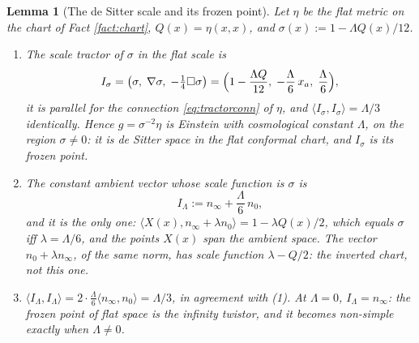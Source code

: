 \documentclass[11pt]{article}
\newtheorem{lemma}[theorem]{Lemma}
\theoremstyle{definition}
\newcommand{\ip}[2]{\langle #1, #2\rangle}
\begin{document}
\begin{lemma}[The de Sitter scale and its frozen point]\label{lem:dsscale}
Let $\eta$ be the flat metric on the chart of Fact \ref{fact:chart}, $Q(x) = \eta(x,x)$, and $\sigma(x) := 1 - \Lambda Q(x)/12$.
\begin{enumerate}
\item The scale tractor of $\sigma$ in the flat scale is
\[
I_{\sigma} = \bigl(\sigma,\; \nabla\sigma,\; -\tfrac14\Box\sigma\bigr) = \Bigl(1 - \frac{\Lambda Q}{12},\; -\frac{\Lambda}{6}\,x_{a},\; \frac{\Lambda}{6}\Bigr),
\]
it is parallel for the connection \eqref{eq:tractorconn} of $\eta$, and $\ip{I_{\sigma}}{I_{\sigma}} = \Lambda/3$ identically. Hence $g = \sigma^{-2}\eta$ is Einstein with cosmological constant $\Lambda$, on the region $\sigma \neq 0$: it is de Sitter space in the flat conformal chart, and $I_{\sigma}$ is its frozen point.
\item The constant ambient vector whose scale function is $\sigma$ is
\[
I_{\Lambda} := n_{\infty} + \frac{\Lambda}{6}\, n_{0},
\]
and it is the only one: $\ip{X(x)}{n_{\infty} + \lambda n_{0}} = 1 - \lambda Q(x)/2$, which equals $\sigma$ iff $\lambda = \Lambda/6$, and the points $X(x)$ span the ambient space. The vector $n_{0} + \lambda n_{\infty}$, of the same norm, has scale function $\lambda - Q/2$: the inverted chart, not this one.
\item $\ip{I_{\Lambda}}{I_{\Lambda}} = 2 \cdot \tfrac{\Lambda}{6}\ip{n_{\infty}}{n_{0}} = \Lambda/3$, in agreement with (1). At $\Lambda = 0$, $I_{\Lambda} = n_{\infty}$: the frozen point of flat space is the infinity twistor, and it becomes non-simple exactly when $\Lambda \neq 0$.
\end{enumerate}
\end{lemma}
\end{document}
